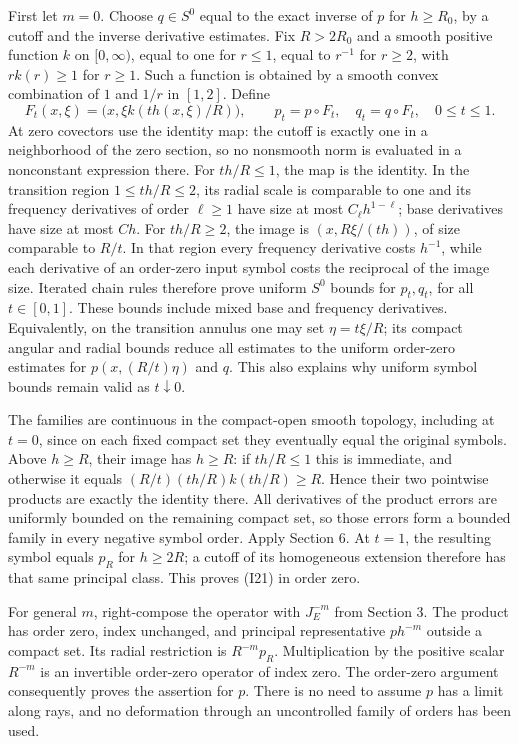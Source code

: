\documentclass[
  11pt,
]{article}
\begin{document}
First let \(m=0\). Choose \(q\in S^0\) equal to the exact inverse of
\(p\) for \(h\geq R_0\), by a cutoff and the inverse derivative
estimates. Fix \(R>2R_0\) and a smooth positive function \(k\) on
\([0,\infty)\), equal to one for \(r\leq1\), equal to \(r^{-1}\) for
\(r\geq2\), with \(r k(r)\geq1\) for \(r\geq1\). Such a function is
obtained by a smooth convex combination of \(1\) and \(1/r\) in
\([1,2]\). Define \[
F_t(x,\xi)=\bigl(x,\xi k(th(x,\xi)/R)\bigr),
\qquad p_t=p\circ F_t,\quad q_t=q\circ F_t,
\quad 0\leq t\leq1.
\tag{I22}
\] At zero covectors use the identity map: the cutoff is exactly one in
a neighborhood of the zero section, so no nonsmooth norm is evaluated in
a nonconstant expression there. For \(th/R\leq1\), the map is the
identity. In the transition region \(1\leq th/R\leq2\), its radial scale
is comparable to one and its frequency derivatives of order
\(\ell\geq1\) have size at most \(C_\ell h^{1-\ell}\); base derivatives
have size at most \(C h\). For \(th/R\geq2\), the image is
\((x,R\xi/(t h))\), of size comparable to \(R/t\). In that region every
frequency derivative costs \(h^{-1}\), while each derivative of an
order-zero input symbol costs the reciprocal of the image size. Iterated
chain rules therefore prove uniform \(S^0\) bounds for \(p_t,q_t\), for
all \(t\in[0,1]\). These bounds include mixed base and frequency
derivatives. Equivalently, on the transition annulus one may set
\(\eta=t\xi/R\); its compact angular and radial bounds reduce all
estimates to the uniform order-zero estimates for \(p(x,(R/t)\eta)\) and
\(q\). This also explains why uniform symbol bounds remain valid as
\(t\downarrow0\).

The families are continuous in the compact-open smooth topology,
including at \(t=0\), since on each fixed compact set they eventually
equal the original symbols. Above \(h\geq R\), their image has
\(h\geq R\): if \(th/R\leq1\) this is immediate, and otherwise it equals
\((R/t)(th/R)k(th/R)\geq R\). Hence their two pointwise products are
exactly the identity there. All derivatives of the product errors are
uniformly bounded on the remaining compact set, so those errors form a
bounded family in every negative symbol order. Apply Section 6. At
\(t=1\), the resulting symbol equals \(p_R\) for \(h\geq2R\); a cutoff
of its homogeneous extension therefore has that same principal class.
This proves (I21) in order zero.

For general \(m\), right-compose the operator with \(J_E^{-m}\) from
Section 3. The product has order zero, index unchanged, and principal
representative \(p h^{-m}\) outside a compact set. Its radial
restriction is \(R^{-m}p_R\). Multiplication by the positive scalar
\(R^{-m}\) is an invertible order-zero operator of index zero. The
order-zero argument consequently proves the assertion for \(p\). There
is no need to assume \(p\) has a limit along rays, and no deformation
through an uncontrolled family of orders has been used.
\end{document}
